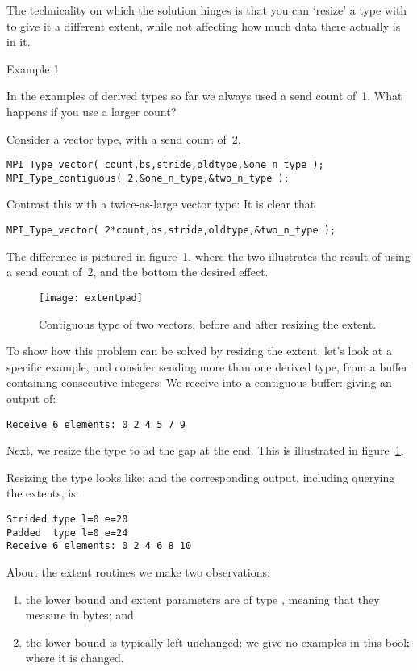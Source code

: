 The technicality on which the solution hinges is that you can `resize' a type
with 
to give it a different extent, while not affecting how much data there
actually is in it.

 {Example 1}
\label{sec:extent-ex1}

In the examples of derived types so far
we always used a send count of~1.
What happens if you use a larger count?

Consider a vector type, with a send count of~2.
\begin{lstlisting}
MPI_Type_vector( count,bs,stride,oldtype,&one_n_type );
MPI_Type_contiguous( 2,&one_n_type,&two_n_type );
\end{lstlisting}
Contrast this with a twice-as-large vector type:
It is clear that
\begin{lstlisting}
MPI_Type_vector( 2*count,bs,stride,oldtype,&two_n_type );
\end{lstlisting}
The difference is pictured in figure~\ref{fig:extentpad},
where the two illustrates the result of using a send count of~2,
and the bottom the desired effect.

\begin{figure}[ht]
  \texttt{[image: extentpad]}
  \caption{Contiguous type of two vectors,
    before and after resizing the extent.}
  \label{fig:extentpad}
\end{figure}

To show how this problem can be solved by resizing the extent,
let's look at a specific example, and
consider sending more than one derived type,
from a buffer containing consecutive integers:
%
%
We receive into a contiguous buffer:
%
%
giving an output of:
\begin{verbatim}
Receive 6 elements: 0 2 4 5 7 9
\end{verbatim}
Next, we resize the type to ad the gap at the end.
This is illustrated in figure~\ref{fig:extentpad}.

Resizing the type looks like:
%
%
and the corresponding output,
including querying the extents,
is:
\begin{verbatim}
Strided type l=0 e=20
Padded  type l=0 e=24
Receive 6 elements: 0 2 4 6 8 10
\end{verbatim}

About the extent routines we make two observations:
\begin{enumerate}
\item the lower bound and extent parameters are of type ,
  meaning that they measure in bytes; and
\item the lower bound is typically left unchanged: we give no examples
  in this book where it is changed.
\end{enumerate}

